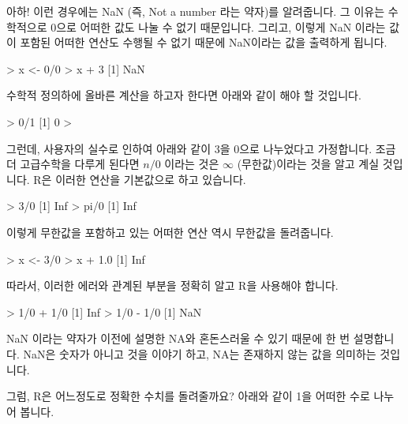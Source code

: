\documentclass{book}
\begin{document}
아하! 이런 경우에는 NaN (즉, Not a number 라는 약자)를 알려줍니다. 
그 이유는 수학적으로 0으로 어떠한 값도 나눌 수 없기 때문입니다. 
그리고, 이렇게 NaN 이라는 값이 포함된 어떠한 연산도 수행될 수 없기 때문에 NaN이라는 값을 출력하게 됩니다. 

\begin{Schunk}
\begin{Soutput}
> x <- 0/0
> x + 3
[1] NaN
\end{Soutput}
\end{Schunk}

수학적 정의하에 올바른 계산을 하고자 한다면 아래와 같이 해야 할 것입니다. 

\begin{Schunk}
\begin{Soutput}
> 0/1
[1] 0
> 
\end{Soutput}
\end{Schunk}

그런데, 사용자의 실수로 인하여 아래와 같이 3을 0으로 나누었다고 가정합니다. 
조금더 고급수학을 다루게 된다면 $n/0$ 이라는 것은 $\infty$ (무한값)이라는 것을 알고 계실 것입니다.
R은 이러한 연산을 기본값으로 하고 있습니다. 

\begin{Schunk}
\begin{Soutput}
> 3/0
[1] Inf
> pi/0
[1] Inf
\end{Soutput}
\end{Schunk}

이렇게 무한값을 포함하고 있는 어떠한 연산 역시 무한값을 돌려줍니다. 

\begin{Schunk}
\begin{Soutput}
> x <- 3/0
> x + 1.0
[1] Inf
\end{Soutput}
\end{Schunk}

따라서, 이러한 에러와 관계된 부분을 정확히 알고 R을 사용해야 합니다. 

\begin{Schunk}
\begin{Soutput}
> 1/0 + 1/0
[1] Inf
> 1/0 - 1/0
[1] NaN
\end{Soutput}
\end{Schunk}

NaN 이라는 약자가 이전에 설명한 NA와 혼돈스러울 수 있기 때문에 한 번 설명합니다. 
NaN은 숫자가 아니고 것을 이야기 하고, NA는 존재하지 않는 값을 의미하는 것입니다. 

그럼, R은 어느정도로 정확한 수치를 돌려줄까요? 
아래와 같이 1을 어떠한 수로 나누어 봅니다. 
\end{document}
